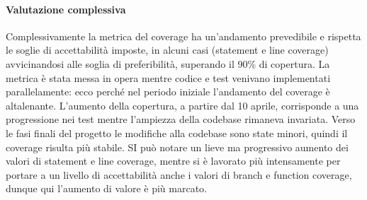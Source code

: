 \paragraph*{Valutazione complessiva}
Complessivamente la metrica del coverage ha un'andamento prevedibile e rispetta le soglie di accettabilità imposte, in alcuni casi (statement e line coverage) avvicinandosi alle soglia di preferibilità, superando il 90\% di copertura.
La metrica è stata messa in opera mentre codice e test venivano implementati parallelamente: ecco perché nel periodo iniziale l'andamento del coverage è altalenante.
L'aumento della copertura, a partire dal 10 aprile, corrisponde a una progressione nei test mentre l'ampiezza della codebase rimaneva invariata.
Verso le fasi finali del progetto le modifiche alla codebase sono state minori, quindi il coverage risulta più stabile. SI può notare  un lieve ma progressivo aumento dei valori di statement e line coverage, mentre si è lavorato più intensamente per portare a un livello di accettabilità anche i valori di branch e function coverage, dunque qui l'aumento di valore è più marcato.

